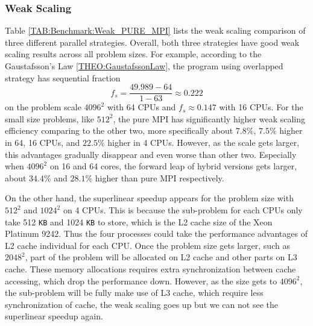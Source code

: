 
\subsubsection{Weak Scaling}\label{SSS:Weak_Scaling:SingleNode}

Table \ref{TAB:Benchmark:Weak_PURE_MPI} lists the weak scaling comparison of three different parallel strategies.
Overall, both three strategies have good weak scaling results across all problem sizes.
For example, according to the Gaustafsson's Law \ref{THEO:GaustafssonLaw}, the program using
overlapped strategy has sequential fraction 
$$f_s = \frac{49.989 - 64}{1-63} \approx 0.222$$
on the problem scale $4096^2$ with 64 CPUs
and $f_s \approx 0.147$ with 16 CPUs.
For the small size problems, like $512^2$, the pure MPI has significantly higher weak scaling efficiency comparing to the other two,
more specifically about $7.8\%$, $7.5\%$ higher in 64, 16 CPUs, and $22.5\%$ higher in 4 CPUs.
However, as the scale gets larger, this advantages gradually disappear and even worse than other two.
Especially when $4096^2$ on 16 and 64 cores, the forward leap of hybrid versions gets larger, about $34.4\%$ and $28.1\%$ higher than 
pure MPI respectively.

On the other hand, the superlinear speedup appears for the problem size with $512^2$ and $1024^2$ on 4 CPUs.
This is because the sub-problem for each CPUs only take 512 \texttt{KB} and 1024 \texttt{KB} to store, 
which is the L2 cache size of the Xeon Platinum 9242.
Thus the four processes could take the performance advantages of L2 cache individual for each CPU.
Once the problem size gets larger, such as $2048^2$, part of the problem will be allocated on L2 cache and other parts on L3 cache.
These memory allocations requires extra synchronization between cache accessing, which drop the performance down.
However, as the size gets to $4096^2$, the sub-problem will be fully make use of L3 cache, which require less synchronization of cache, 
the weak scaling goes up but we can not see the superlinear speedup again.

